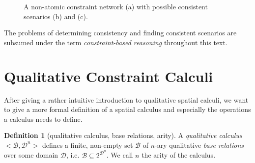 \documentclass[headsepline]{scrreprt}
\theoremstyle{definition}
\newtheorem{defn}{Definition}
\begin{document}
\begin{figure}[ht]
	\centering
	\caption{A non-atomic constraint network (a) with possible consistent
scenarios (b) and (c).}
	\label{fig:br2}
\end{figure}

The problems of determining consistency and finding consistent
scenarios are subsumed under the term
\emph{constraint-based reasoning} throughout this
text.

\section{Qualitative Constraint Calculi}

After giving a rather intuitive introduction to
qualitative spatial calculi, we want to give a more
formal definition of a spatial calculus and especially
the operations a calculus needs to define.

\begin{defn}[qualitative calculus, base relations, arity]
	A {\em qualitative calculus} $<\mathcal{B}, \mathcal{D}^n>$ defines a finite, non-empty set $\mathcal{B}$ of $n$-ary qualitative {\em base relations} over some domain $\mathcal{D}$, i.e. $\mathcal{B} \subseteq 2^{\mathcal{D}^n}$.
	We call $n$ the arity of the calculus.
\end{defn}
\end{document}
